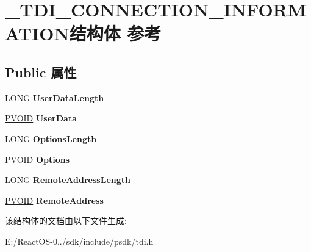 \hypertarget{struct___t_d_i___c_o_n_n_e_c_t_i_o_n___i_n_f_o_r_m_a_t_i_o_n}{}\section{\+\_\+\+T\+D\+I\+\_\+\+C\+O\+N\+N\+E\+C\+T\+I\+O\+N\+\_\+\+I\+N\+F\+O\+R\+M\+A\+T\+I\+O\+N结构体 参考}
\label{struct___t_d_i___c_o_n_n_e_c_t_i_o_n___i_n_f_o_r_m_a_t_i_o_n}
\subsection*{Public 属性}
\begin{DoxyCompactItemize}
\item 
\mbox{\label{struct___t_d_i___c_o_n_n_e_c_t_i_o_n___i_n_f_o_r_m_a_t_i_o_n_a57f35dc3c6e0abc862087f8e7e5342f2}} 
L\+O\+NG {\bfseries User\+Data\+Length}
\item 
\mbox{\label{struct___t_d_i___c_o_n_n_e_c_t_i_o_n___i_n_f_o_r_m_a_t_i_o_n_a53feef64ba8503f7078d7d161f208bfb}} 
\hyperlink{interfacevoid}{P\+V\+O\+ID} {\bfseries User\+Data}
\item 
\mbox{\label{struct___t_d_i___c_o_n_n_e_c_t_i_o_n___i_n_f_o_r_m_a_t_i_o_n_a2f7c144b15d9ce1e2136502037519044}} 
L\+O\+NG {\bfseries Options\+Length}
\item 
\mbox{\label{struct___t_d_i___c_o_n_n_e_c_t_i_o_n___i_n_f_o_r_m_a_t_i_o_n_af6ab1bef673c226145078853fadc3e66}} 
\hyperlink{interfacevoid}{P\+V\+O\+ID} {\bfseries Options}
\item 
\mbox{\label{struct___t_d_i___c_o_n_n_e_c_t_i_o_n___i_n_f_o_r_m_a_t_i_o_n_a591731129cd7705d163ab0d1192fd818}} 
L\+O\+NG {\bfseries Remote\+Address\+Length}
\item 
\mbox{\label{struct___t_d_i___c_o_n_n_e_c_t_i_o_n___i_n_f_o_r_m_a_t_i_o_n_ab49af869eacad36083505104453c8e8c}} 
\hyperlink{interfacevoid}{P\+V\+O\+ID} {\bfseries Remote\+Address}
\end{DoxyCompactItemize}


该结构体的文档由以下文件生成\+:\begin{DoxyCompactItemize}
\item 
E\+:/\+React\+O\+S-\/0../sdk/include/psdk/tdi.\+h\end{DoxyCompactItemize}
